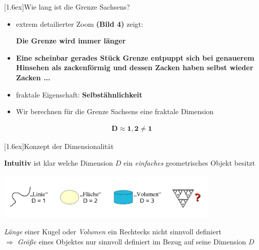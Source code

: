 \documentclass[final]{beamer}
\newlength{\columnheight}
\newlength{\marginw}
\newlength{\tw}
\newlength{\colw}
\newenvironment{myTwoColPoster}{%
  \begin{minipage}[t]{\textwidth}%
    \hspace*{\marginw}%
    \hspace*{9.5bp}%
    \begin{minipage}[t]{\tw}}%
  {\end{minipage}%
   \hspace*{\marginw}%
   \end{minipage}}
\newenvironment{myCol}%
    {\begin{minipage}[t][\columnheight][t]{\colw}}%
    {\end{minipage}}
\newenvironment{textblock}[1]%
    {\begin{block}{\rule[-0.6ex]{0pt}{2.4ex}\raisebox{-0.25ex}[1.6ex]{#1}}%
     \vspace*{5mm}}%
    {\vspace*{5mm}\end{block}}
\begin{document}
\begin{frame}[t]{}
\begin{myTwoColPoster}
\begin{myCol}
\begin{textblock}{Wie lang ist die Grenze Sachsens?}
\begin{minipage}[c]{0.99\textwidth}
\begin{center}
      \end{center}
      \begin{itemize} \large \setlength\itemsep{1.2em}
        \item extrem detailierter Zoom \textbf{(Bild 4)} zeigt:
        \begin{center}
          \textbf{\textcolor{IPFbrown}{Die Grenze wird immer länger}}
        \end{center}
      \end{itemize}
      \begin{itemize} \large \setlength\itemsep{1.2em}
        \item \textbf{Eine scheinbar gerades St\"uck Grenze entpuppt sich bei genauerem Hinsehen als zackenf\"ormig und dessen Zacken haben selbst wieder Zacken ...}
        \item fraktale Eigenschaft: \textbf{\textcolor{IPFred}{Selbstähnlichkeit}}
        \item Wir berechnen f\"ur die Grenze Sachsens eine fraktale Dimension
      \end{itemize}
      \Large
      \begin{align*}
        \boldsymbol{D \approx 1,2 \neq 1}
      \end{align*}
    \end{minipage}

  \end{textblock}

  \begin{textblock}{Konzept der Dimensionalit\"at}
    \large \textbf{  \textcolor{IPFred}{Intuitiv} } ist klar welche Dimension $D$ ein \textit{einfaches} geometrisches Objekt besitzt
    \begin{center}
        \includegraphics[width=0.8\textwidth]{fig/bsp}
    \end{center}
    \begin{center}
      \textit{L\"ange} einer Kugel oder \textit{Volumen} ein Rechtecks nicht sinnvoll definiert \\[1cm]
      {\Large \textcolor{IPFred}{ $\Rightarrow$ \textit{ Gr\"o\ss e} eines Objektes nur sinnvoll definiert im Bezug auf seine Dimension $D$}}
    \end{center}


\end{textblock}
\end{myCol}
\end{myTwoColPoster}
\end{frame}
\end{document}
